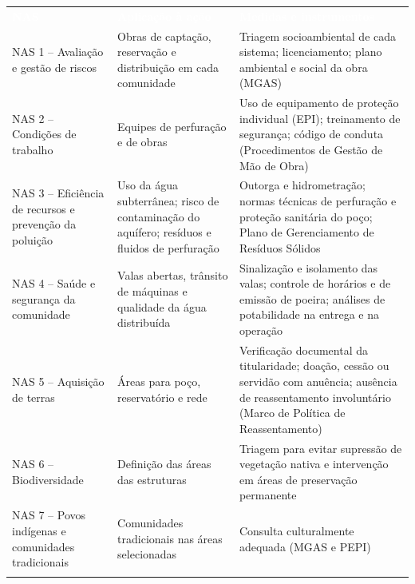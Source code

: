 \begin{quadro}[H]
  \caption{Aplicação das Normas Ambientais e Sociais à implantação dos sistemas coletivos de abastecimento de água}\label{nas-3223}
  \footnotesize\renewcommand{\arraystretch}{1.25}\setlength{\tabcolsep}{5pt}
  \begin{tabular}{>{\raggedright\arraybackslash}p{}>{\raggedright\arraybackslash}p{}>{\raggedright\arraybackslash}p{}}
    \rowcolor{azulEscuro}\textcolor{white}{\textbf{NAS}} & \textcolor{white}{\textbf{Aplicação à ação}} & \textcolor{white}{\textbf{Medidas e instrumentos}} \\
    NAS 1 – Avaliação e gestão de riscos & Obras de captação, reservação e distribuição em cada comunidade & Triagem socioambiental de cada sistema; licenciamento; plano ambiental e social da obra (MGAS) \\ \arrayrulecolor{cinza20}\hline
    \rowcolor{cinza5}NAS 2 – Condições de trabalho & Equipes de perfuração e de obras & Uso de equipamento de proteção individual (EPI); treinamento de segurança; código de conduta (Procedimentos de Gestão de Mão de Obra) \\ \arrayrulecolor{cinza20}\hline
    NAS 3 – Eficiência de recursos e prevenção da poluição & Uso da água subterrânea; risco de contaminação do aquífero; resíduos e fluidos de perfuração & Outorga e hidrometração; normas técnicas de perfuração e proteção sanitária do poço; Plano de Gerenciamento de Resíduos Sólidos \\ \arrayrulecolor{cinza20}\hline
    \rowcolor{cinza5}NAS 4 – Saúde e segurança da comunidade & Valas abertas, trânsito de máquinas e qualidade da água distribuída & Sinalização e isolamento das valas; controle de horários e de emissão de poeira; análises de potabilidade na entrega e na operação \\ \arrayrulecolor{cinza20}\hline
    NAS 5 – Aquisição de terras & Áreas para poço, reservatório e rede & Verificação documental da titularidade; doação, cessão ou servidão com anuência; ausência de reassentamento involuntário (Marco de Política de Reassentamento) \\ \arrayrulecolor{cinza20}\hline
    \rowcolor{cinza5}NAS 6 – Biodiversidade & Definição das áreas das estruturas & Triagem para evitar supressão de vegetação nativa e intervenção em áreas de preservação permanente \\ \arrayrulecolor{cinza20}\hline
    NAS 7 – Povos indígenas e comunidades tradicionais & Comunidades tradicionais nas áreas selecionadas & Consulta culturalmente adequada (MGAS e PEPI) \\ \arrayrulecolor{cinza20}\hline

\end{tabular}
\end{quadro}

